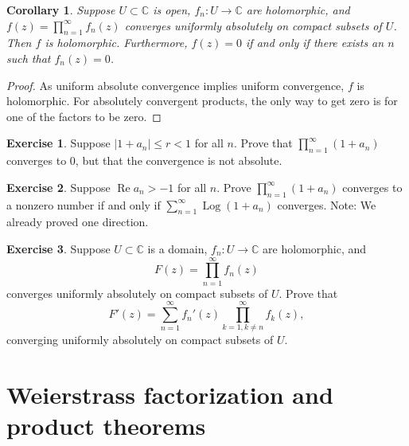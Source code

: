 \documentclass[12pt,openany]{book}
\renewcommand{\Re}{\operatorname{Re}}
\newcommand{\Log}{\operatorname{Log}}
\newcommand{\sabs}[1]{\lvert {#1} \rvert}
\newcommand{\C}{{\mathbb{C}}}
\theoremstyle{plain}
\newtheorem{cor}[thm]{Corollary}
\theoremstyle{remark}
\theoremstyle{definition}
\newenvironment{exbox}{%
    \def\FrameCommand{\vrule width 1pt \relax\hspace{10pt}}%
    \MakeFramed{\advance\hsize-\width\FrameRestore}%
}{%
    \endMakeFramed
}
\theoremstyle{exercise}
\newtheorem{exercise}{Exercise}[section]
\theoremstyle{example}
\begin{document}
\begin{cor}
Suppose $U \subset \C$ is open, $f_n \colon U \to \C$ are holomorphic,
and $f(z) = \prod_{n=1}^\infty f_n(z)$ converges uniformly absolutely
on compact subsets of $U$.  Then $f$ is holomorphic.  Furthermore, $f(z)=0$
if and only if there exists an $n$ such that $f_n(z)=0$.
\end{cor}

\begin{proof}
As uniform absolute convergence implies uniform convergence, $f$
is holomorphic.  For absolutely convergent products, the only
way to get zero is for one of the factors to be zero.
\end{proof}

\begin{exbox}
\begin{exercise}
Suppose $\sabs{1+a_n} \leq r < 1$ for all $n$.
Prove that $\prod_{n=1}^\infty (1+a_n)$ converges to $0$, but that the
convergence is not absolute.
\end{exercise}

\begin{exercise}
Suppose $\Re a_n > -1$ for all $n$.  
Prove 
$\prod_{n=1}^\infty (1+a_n)$
converges to a nonzero number if and only if
$\sum_{n=1}^\infty \Log (1+a_n)$ converges.  Note: We already proved one
direction.
\end{exercise}

\begin{exercise}%
\label{exercise:proddiff}
Suppose $U \subset \C$ is a domain,
$f_n \colon U \to \C$ are holomorphic, and
\begin{equation*}
F(z) = \prod_{n=1}^\infty f_n(z)
\end{equation*}
converges uniformly absolutely
on compact subsets of $U$.  Prove that
\begin{equation*}
F'(z) = \sum_{n=1}^\infty f_n'(z) \prod_{k=1, k \neq n}^\infty f_k(z) ,
\end{equation*}
converging uniformly absolutely on compact subsets of $U$.
\end{exercise}
\end{exbox}


\section{Weierstrass factorization and product theorems}
\label{sec:weier}
\end{document}

